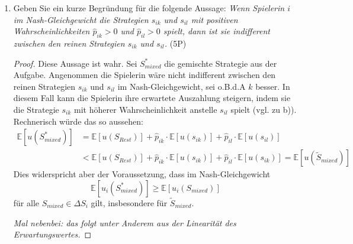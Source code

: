 \documentclass[12pt]{article}
\begin{document}
\begin{enumerate}[label=\alph*\upshape)]
\begin{proof}
			Die lange Antwort: angenommen Spieler 2 würde in einem gemischten Gleichgewicht $b_3$ mit positiver Wahrscheinlichkeit $q_3 > 0$ spielen. Da $b_3$ strikt dominiert durch $b_2$ ist, lohnt es sich (unabhängig davon was Spieler 1 macht) für Spieler 2 $b_2$ anstatt $b_3$ zu spielen, also $b_3$ nicht zu spielen und die Wahrscheinlichkeit für $b_2$ um $q_3$ zu erhöhen. Da wir wissen, dass in einem Gleichgewicht $b_3$ nie gespielt werden wird, können wir analog zu oben $a_2$ für Spieler 1 ausschließen und danach ebenso $b_1$ für Spieler 2. ~\smallskip
			
			Da also nur eine Strategie pro Spieler die Eliminierung von strikt dominierten Strategien überlebt, kann es keine (echt) gemischten Strategien geben.
		\end{proof}
	\item Geben Sie ein kurze Begründung für die folgende Aussage: \textit{Wenn Spielerin $i$ im Nash-Gleichgewicht die Strategien $s_{ik}$ und $s_{il}$ mit positiven Wahrscheinlichkeiten $\hat{p}_{ik} > 0$ und $\hat{p}_{il} > 0$ spielt, dann ist sie indifferent zwischen den reinen Strategien $s_{ik}$ und $s_{il}$.} (5P)
		\begin{proof}
			Diese Aussage ist wahr. Sei $S^*_{mixed}$ die gemischte Strategie aus der Aufgabe. Angenommen die Spielerin wäre nicht indifferent zwischen den reinen Strategien $s_{ik}$ und $s_{il}$ im Nash-Gleichgewicht, sei o.B.d.A $k$ besser. In diesem Fall kann die Spielerin ihre erwartete Auszahlung steigern, indem sie die Strategie $s_{ik}$ mit höherer Wahrscheinlichkeit anstelle $s_{il}$ spielt (vgl. zu b)). Rechnerisch würde das so aussehen:
			\begin{align*}
				\mathbb{E}[u(S^*_{mixed})] & = \mathbb{E}[u(S_{Rest})] + \hat{p}_{ik} \cdot \mathbb{E}[u(s_{ik})] + \hat{p}_{il} \cdot \mathbb{E}[u(s_{il})] \\
				& < \mathbb{E}[u(S_{Rest})] +\hat{p}_{ik} \cdot \mathbb{E}[u(s_{ik})] + \hat{p}_{il} \cdot \mathbb{E}[u(s_{ik})] = \mathbb{E}[u(\tilde{S}_{mixed})]
			\end{align*}
			Dies widerspricht aber der Voraussetzung, dass im Nash-Gleichgewicht 
			$$ \mathbb{E}[u_i(S^*_{mixed})] \geq \mathbb{E}[u_i(S_{mixed})]  $$
			für alle $S_{mixed} \in \Delta S_i$ gilt, insbesondere für $\tilde{S}_{mixed}$. ~\smallskip
			
			\textit{Mal nebenbei: das folgt unter Anderem aus der Linearität des Erwartungswertes.}
		\end{proof}
\end{enumerate}
\end{document}
